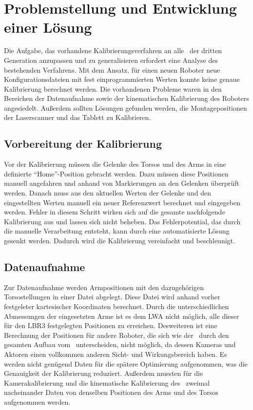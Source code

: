 \chapter{Problemstellung und Entwicklung einer Lösung}

Die Aufgabe, das vorhandene Kalibrierungsverfahren an alle \cob\ der dritten 
Generation anzupassen und zu generalisieren erfordert eine Analyse des
bestehenden Verfahrens. Mit dem Ansatz, für einen neuen Roboter neue Konfigurationsdateien 
mit fest einprogrammierten Werten konnte keine genaue Kalibrierung berechnet werden.
Die vorhandenen Probleme waren in den Bereichen der Datenaufnahme
sowie der kinematischen Kalibrierung des Roboters angesiedelt. 
Außerdem sollten Lösungen gefunden werden, die Montagepositionen der 
Laserscanner und das Tablett zu Kalibrieren.


\section{Vorbereitung der Kalibrierung}
\label{sec:Vorbereitung der Kalibrierung}
Vor der Kalibrierung müssen die Gelenke des Torsos und des Arms in eine definierte
"`Home"'-Position gebracht werden. Dazu müssen diese Positionen manuell angefahren
und anhand von Markierungen an den Gelenken überprüft werden. Danach muss aus 
den aktuellen Werten der Gelenke und den eingestellten Werten manuell ein neuer
Referenzwert berechnet und eingegeben werden. Fehler in diesem Schritt wirken 
sich auf die gesamte nachfolgende Kalibrierung aus und lassen sich nicht beheben.
Das Fehlerpotential, das durch die manuelle Verarbeitung entsteht, kann durch 
eine automatisierte Lösung gesenkt werden. Dadurch wird die Kalibrierung 
vereinfacht und beschleunigt.


\section{Datenaufnahme} %

\label{sec:Datenaufnahme}

Zur Datenaufnahme
werden Armpositionen mit den dazugehörigen Torsostellungen in einer Datei 
abgelegt. Diese Datei wird anhand vorher festgeleter kartesischer Koordinaten
berechnet. Durch die unterschiedlichen Abmessungen der eingesetzten Arme 
ist es dem \ac{LWA} nicht möglich, alle dieser für den \ac{LBR3} festgelegten 
Positionen zu erreichen. Desweiteren ist eine Berechnung der Positionen
für andere Roboter, die sich wie der \raw\ durch den gesamten Aufbau vom 
\cob\ unterscheiden, nicht möglich, da dessen Kameras und Aktoren einen vollkommen
anderen Sicht- und Wirkungsbereich haben. Es werden nicht genügend Daten für die spätere 
Optimierung aufgenommen, was die Genauigkeit der Kalibrierung reduziert.
Außerdem mussten für die Kamerakalibrierung und die kinematische Kalibrierung 
des \cob\ zweimal nacheinander Daten von denselben Positionen des Arms und des Torsos
aufgenommen werden.

